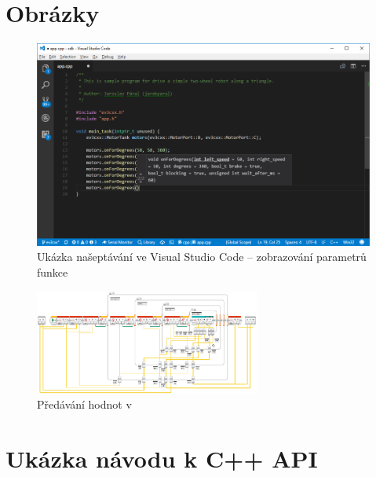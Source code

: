 \chapter{Obrázky}


\begin{figure}[h]
    \centering
    \includegraphics[width=\textwidth]{images/visual-studio-code_intellisense-param.png}
    \caption{Ukázka našeptávání ve Visual Studio Code -- zobrazování parametrů funkce}
    \label{fig:visual-studio-code_intellisense-param}
\end{figure}


\begin{figure}[h]
	\centering
	\includegraphics[angle=-90,origin=c,width=280px]{images/lego-soft_legolib_match_array_length.png}
	\caption[Předávání hodnot v \legoSW{}]{Předávání hodnot v \legoSW{}}
	\label{fig:lego-soft_legolib_match_array_length}
\end{figure}



\chapter{Ukázka návodu k C++ API}



















